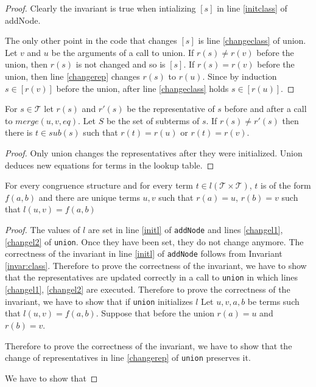 \begin{proof}

Clearly the invariant is true when intializing $[s]$ in line \ref{initclass} of addNode.

The only other point in the code that changes $[s]$ is line \ref{changeclass} of union.
Let $v$ and $u$ be the arguments of a call to union.
If $r(s) \neq r(v)$ before the union, then $r(s)$ is not changed and so is $[s]$.
If $r(s) = r(v)$ before the union, then line \ref{changerep} changes $r(s)$ to $r(u)$.
Since by induction $s \in [r(v)]$ before the union, after line \ref{changeclass} holds $s \in [r(u)]$.

\end{proof}

\begin{assertion}

For $s \in \mathcal{T}$ let $r(s)$ and $r'(s)$ be the representative of $s$ before and after a call to $merge(u,v,eq)$.
Let $S$ be the set of subterms of $s$.
If $r(s) \neq r'(s)$ then there is $t \in sub(s)$ such that $r(t) = r(u)$ or $r(t) = r(v)$.

\end{assertion}

\begin{proof}

Only union changes the representatives after they were initialized.
Union deduces new equations for terms in the lookup table.

\end{proof}

\begin{invariant}[Lookup]

For every congruence structure and for every term $t \in l(\mathcal{T}\times \mathcal{T})$, $t$ is of the form $f(a,b)$ and there are unique terms $u,v$ such that $r(a) = u$, $r(b) = v$ such that $l(u,v) = f(a,b)$

\end{invariant}

\begin{proof}

The values of $l$ are set in line \ref{initl} of \texttt{addNode} and lines \ref{changel1}, \ref{changel2} of \texttt{union}. 
Once they have been set, they do not change anymore.
The correctness of the invariant in line \ref{initl} of \texttt{addNode} follows from Invariant \ref{invar:class}.
Therefore to prove the correctness of the invariant, we have to show that the representatives are updated correctly in a call to \texttt{union} in which lines \ref{changel1}, \ref{changel2} are executed.
Therefore to prove the correctness of the invariant, we have to show that if \texttt{union} initializes $l$
Let $u,v,a,b$ be terms such that $l(u,v) = f(a,b)$.
Suppose that before the union $r(a) = u$ and $r(b) = v$.

Therefore to prove the correctness of the invariant, we have to show that the change of representatives in line \ref{changerep} of \texttt{union} preserves it.

We have to show that 

\end{proof}



